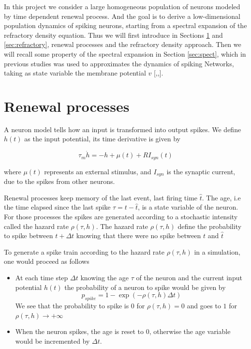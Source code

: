 \documentclass[12pt,twoside]{report}
\begin{document}
In this project we consider a large homogeneous population of neurons modeled by time dependent renewal process. And the goal is to derive a low-dimensional population dynamics of spiking neurons, starting from a spectral expansion of the refractory density equation. Thus we will first introduce in Sections \ref{sec:renew} and \ref{sec:refractory}, renewal processes and the refractory density approach. Then we will recall some property of the spectral expansion in Section \ref{sec:spect}, which in previous studies was used to approximates the dynamics of spiking Networks, taking as state variable the membrane potential $v$ [\cite{MatGiu02},\cite{SchOst13},\cite{AugLad17}].



\section{Renewal processes} %
\label{sec:renew}



A neuron model tells how an input is transformed into output spikes. We define $h(t)$ as the input potential, its time derivative is given by

\begin{equation}
\label{eq:h}
\tau_m\dot{h}=-h+\mu(t) +RI_{syn}(t)
\end{equation}

where $\mu(t)$ represents an external stimulus, and $I_{syn}$ is the synaptic current, due to the spikes from other neurons.

Renewal processes keep memory of the last event, last firing time $\hat{t}$. The age, i.e the time elapsed since the last spike $\tau=t-\hat{t}$, is a state variable of the neuron. For those processes the spikes are generated according to a stochastic intensity called the hazard rate $\rho(\tau,h)$. The hazard rate $\rho(\tau,h)$ define the probability to spike between $t+\Delta t$ knowing that there were no spike between $t$ and $\hat{t}$

To generate a spike train according to the hazard rate $\rho(\tau,h)$ in a simulation, one would proceed as follows
\begin{itemize}
\item At each time step $\Delta t$ knowing the age $\tau$ of the neuron and the current input potential $h(t)$ the probability of a neuron to spike would be given by \begin{equation}
p_{spike}=1-\exp(-\rho(\tau,h)\Delta t)
\end{equation} We see that the probability to spike is $0$ for $\rho(\tau,h)=0$ and goes to $1$ for $\rho(\tau,h)\rightarrow +\infty$
\item When the neuron spikes, the age is reset to $0$, otherwise the age variable would be incremented by $\Delta t$. 
\end{itemize}
\end{document}
